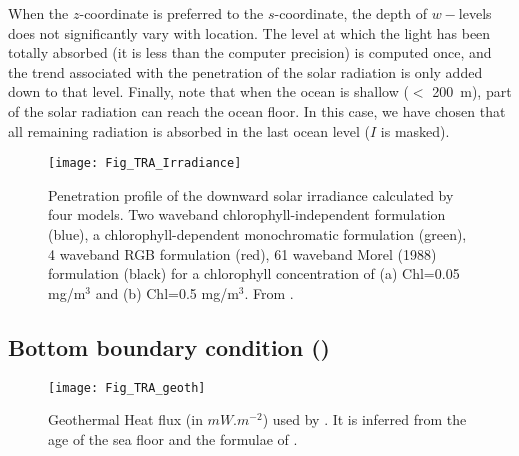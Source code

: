 \documentclass[../main/NEMO_manual]{subfiles}
\begin{document}
When the $z$-coordinate is preferred to the $s$-coordinate,
the depth of $w-$levels does not significantly vary with location.
The level at which the light has been totally absorbed
(\ie it is less than the computer precision) is computed once,
and the trend associated with the penetration of the solar radiation is only added down to that level.
Finally, note that when the ocean is shallow ($<$ 200~m), part of the solar radiation can reach the ocean floor.
In this case, we have chosen that all remaining radiation is absorbed in the last ocean level
(\ie $I$ is masked). 

\begin{figure}[!t]
  \begin{center}
    \texttt{[image: Fig\_TRA\_Irradiance]}
    \caption{
      \protect\label{fig:traqsr_irradiance}
      Penetration profile of the downward solar irradiance calculated by four models.
      Two waveband chlorophyll-independent formulation (blue),
      a chlorophyll-dependent monochromatic formulation (green),
      4 waveband RGB formulation (red),
      61 waveband Morel (1988) formulation (black) for a chlorophyll concentration of
      (a) Chl=0.05 mg/m$^3$ and (b) Chl=0.5 mg/m$^3$.
      From \citet{Lengaigne_al_CD07}.
    }
  \end{center}
\end{figure}

\subsection{Bottom boundary condition (\protect{})}
\label{subsec:TRA_bbc}

\begin{figure}[!t]
  \begin{center}
    \texttt{[image: Fig\_TRA\_geoth]}
    \caption{
      \protect\label{fig:geothermal}
      Geothermal Heat flux (in $mW.m^{-2}$) used by \cite{Emile-Geay_Madec_OS09}.
      It is inferred from the age of the sea floor and the formulae of \citet{Stein_Stein_Nat92}.
    }
  \end{center}
\end{figure}
\end{document}
